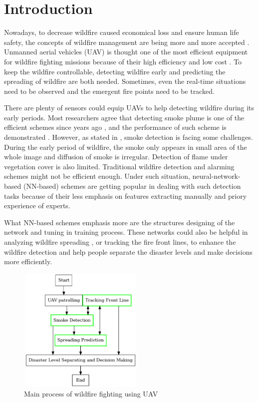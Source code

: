 \section{Introduction}
% 
Nowadays, to decrease wildfire caused economical loss and ensure human life safety, the concepts of wildfire management are being more and more accepted \cite{tymstra2020wildfire}. Unmanned aerial vehicles (UAV) is thought one of the most efficient equipment for wildfire fighting missions because of their high efficiency and low cost \cite{barrado2010wildfire}. To keep the wildfire controllable, detecting wildfire early and predicting the spreading of wildfire are both needed. Sometimes, even the real-time situations need to be observed and the emergent fire points need to be tracked.\par
There are plenty of sensors could equip UAVs to help detecting wildfire during its early periods. Most researchers agree that detecting smoke plume is one of the efficient schemes since years ago \cite{habiboglu2011real}, and the performance of such scheme is demonstrated \cite{ko2012wildfire, labati2013wildfire, aslan2019early}. However, as stated in \cite{changchun2021research}, smoke detection is facing some challenges. During the early period of wildfire, the smoke only appears in small area of the whole image and diffusion of smoke is irregular. Detection of flame under vegetation cover is also limited. Traditional wildfire detection and alarming schemes might not be efficient enough.  Under such situation, neural-network-based (NN-based) schemes are getting popular in dealing with such detection tasks because of their less emphasis on features extracting manually and priory experience of experts.\par
What NN-based schemes emphasis more are the structures designing of the network and tuning in training process. These networks could also be helpful in analyzing wildfire spreading \cite{liang2019neural, burge2020convolutional}, or tracking the fire front lines, to enhance the wildfire detection and help people separate the disaster levels and make decisions more efficiently.\par
\begin{figure}[ht]
    \centering
    \includegraphics[width=60mm,height=60mm]{figs/arrangement.png}
    \caption{Main process of wildfire fighting using UAV}
    \label{fig:arrangement}
\end{figure}
